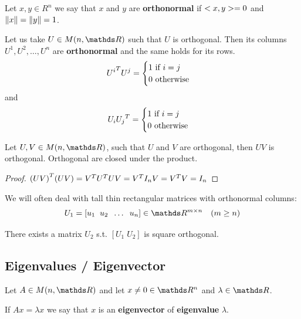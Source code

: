 \documentclass[ComputationalMathematics.tex]{subfiles}
\begin{document}
\begin{definition}[Orthonormality]
  Let $x, y \in R^n$ we say that $x$ and $y$ are \textbf{orthonormal} if $<x, y> = 0$ and $\left\lVert x\right\rVert = \left\lVert y\right\rVert = 1$.
\end{definition}

\begin{proposition}
  Let us take $U \in M(n, \R)$ such that $U$ is orthogonal. Then its columns $U^1, U^2, \ldots, U^n$ are \textbf{orthonormal} and the same holds for its rows.
  \[
  {U^i}^{T} U^j = \begin{cases}
    1 \text{ if } i=j\\
    0 \text{ otherwise}
  \end{cases}
  \]
  and
  \[
    U_i {U_j}^{T} = \begin{cases}
    1 \text{ if } i=j\\
    0 \text{ otherwise}
  \end{cases}
  \]
\end{proposition}

\begin{proposition}
  Let $U, V \in M(n, \R)$, such that $U$ and $V$ are orthogonal, then $U V$ is orthogonal. Orthogonal are closed under the product.
\end{proposition}
\begin{proof}
  ${(UV)}^{T} (UV) = {V}^{T} {U}^{T} U V = {V}^{T} I_n V = {V}^{T} V = I_n$
\end{proof}


\begin{proposition}
We will often deal with tall thin rectangular matrices with
orthonormal columns:
$$ U_1 = [u_1 \; \; u_2 \; \; \dots \; \; u_n] \in \R^{m \times n} \quad (m \geq n)$$

There exists a matrix $U_2$ s.t. $[U_1 \; U_2]$ is square orthogonal.

  
\end{proposition}

\subsection{Eigenvalues / Eigenvector}

\begin{definition}
  Let $A \in M(n, \R)$ and let $x \neq 0 \in \R^n$ and $\lambda \in \R$.

  If $Ax = \lambda x$ we say that $x$ is an \textbf{eigenvector} of \textbf{eigenvalue} $\lambda$.
\end{definition}
\end{document}
